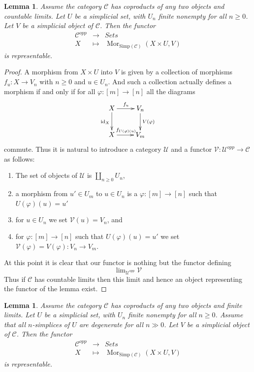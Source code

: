 \documentclass{amsart}
\theoremstyle{plain}
\newtheorem{lemma}[subsection]{Lemma}
\theoremstyle{definition}
\theoremstyle{remark}
\numberwithin{equation}{subsection}
\def\lim{\mathop{\mathrm{lim}}\nolimits}
\def\Mor{\mathop{\mathrm{Mor}}\nolimits}
\begin{document}
\begin{lemma}
\label{lemma-exists-hom-0-from-simplicial-set}
Assume the category $\mathcal{C}$
has coproducts of any two objects and countable
limits. Let $U$ be a simplicial set, with $U_n$ finite nonempty
for all $n \geq 0$.
Let $V$ be a simplicial object of $\mathcal{C}$.
Then the functor
\begin{eqnarray*}
\mathcal{C}^{opp} & \longrightarrow & \textit{Sets} \\
X
& \longmapsto &
\Mor_{\text{Simp}(\mathcal{C})}(X \times U, V)
\end{eqnarray*}
is representable.
\end{lemma}

\begin{proof}
A morphism from $X \times U$ into $V$ is given by a collection
of morphisms $f_u : X \to V_n$ with $n \geq 0$ and $u \in U_n$.
And such a collection actually defines a morphism if and only
if for all $\varphi : [m] \to [n]$ all the diagrams
$$
\xymatrix{
X \ar[r]^{f_u} \ar[d]_{\text{id}_X} & V_n \ar[d]^{V(\varphi)} \\
X \ar[r]^{f_{U(\varphi)(u)}} & V_m
}
$$
commute. Thus it is natural to introduce a category
$\mathcal{U}$ and a functor
$\mathcal{V} : \mathcal{U}^{opp} \to \mathcal{C}$
as follows:
\begin{enumerate}
\item The set of objects of $\mathcal{U}$ is
$\coprod_{n \geq 0} U_n$,
\item a morphism from $u' \in U_m$ to $u \in U_n$
is a $\varphi : [m] \to [n]$ such that $U(\varphi)(u) = u'$
\item for $u \in U_n$ we set $\mathcal{V}(u) = V_n$, and
\item for $\varphi : [m] \to [n]$ such that $U(\varphi)(u) = u'$
we set $\mathcal{V}(\varphi) = V(\varphi) : V_n \to V_m$.
\end{enumerate}
At this point it is clear that our functor is nothing but the
functor defining
$$
\lim_{\mathcal{U}^{opp}} \mathcal{V}
$$
Thus if $\mathcal{C}$ has countable limits then this limit
and hence an object representing the functor of the lemma
exist.
\end{proof}


\begin{lemma}
\label{lemma-exists-hom-0-from-simplicial-set-finite}
Assume the category $\mathcal{C}$
has coproducts of any two objects and finite
limits. Let $U$ be a simplicial set, with $U_n$ finite nonempty
for all $n \geq 0$. Assume that all $n$-simplices
of $U$ are degenerate for all $n \gg 0$.
Let $V$ be a simplicial object of $\mathcal{C}$.
Then the functor
\begin{eqnarray*}
\mathcal{C}^{opp} & \longrightarrow & \textit{Sets} \\
X
& \longmapsto &
\Mor_{\text{Simp}(\mathcal{C})}(X \times U, V)
\end{eqnarray*}
is representable.
\end{lemma}
\end{document}
